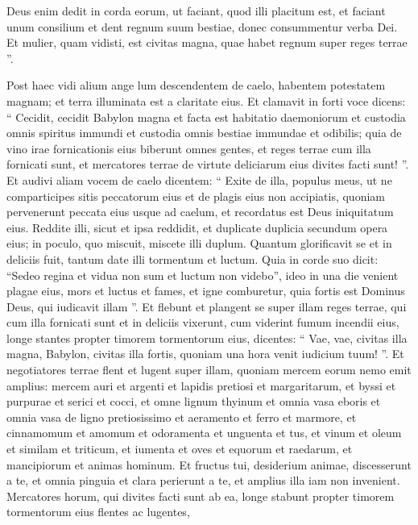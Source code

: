 \begin{biblechapter}
\begin{biblechapter}
\begin{biblechapter}
\begin{biblechapter}
\begin{biblechapter}
\begin{biblechapter}
\begin{biblechapter}
\begin{biblechapter}
\begin{biblechapter}
\begin{biblechapter}
\begin{biblechapter}
\begin{biblechapter}
\begin{biblechapter}
\begin{biblechapter}
\begin{biblechapter}
\begin{biblechapter}
\begin{biblechapter}
\verse Deus enim dedit in corda eorum, ut faciant, quod illi placitum est, et faciant unum consilium et dent regnum suum bestiae, donec consummentur verba Dei. 
\verse Et mulier, quam vidisti, est civitas magna, quae habet regnum super reges terrae ”.
 
\begin{biblechapter}
\verse Post haec vidi alium ange lum descendentem de caelo, habentem potestatem magnam; et terra illuminata est a claritate eius. 
\verse Et clamavit in forti voce dicens: “ Cecidit, cecidit Babylon magna et facta est habitatio daemoniorum et custodia omnis spiritus immundi et custodia omnis bestiae immundae et odibilis; 
\verse quia de vino irae fornicationis eius biberunt omnes gentes, et reges terrae cum illa fornicati sunt, et mercatores terrae de virtute deliciarum eius divites facti sunt! ”.
 \verse Et audivi aliam vocem de caelo dicentem: “ Exite de illa, populus meus, ut ne comparticipes sitis peccatorum eius et de plagis eius non accipiatis, 
\verse quoniam pervenerunt peccata eius usque ad caelum, et recordatus est Deus iniquitatum eius. 
\verse Reddite illi, sicut et ipsa reddidit, et duplicate duplicia secundum opera eius; in poculo, quo miscuit, miscete illi duplum. 
\verse Quantum glorificavit se et in deliciis fuit, tantum date illi tormentum et luctum. Quia in corde suo dicit: “Sedeo regina et vidua non sum et luctum non videbo”, 
\verse ideo in una die venient plagae eius, mors et luctus et fames, et igne comburetur, quia fortis est Dominus Deus, qui iudicavit illam ”.
 \verse Et flebunt et plangent se super illam reges terrae, qui cum illa fornicati sunt et in deliciis vixerunt, cum viderint fumum incendii eius, 
\verse longe stantes propter timorem tormentorum eius, dicentes: “ Vae, vae, civitas illa magna, Babylon, civitas illa fortis, quoniam una hora venit iudicium tuum! ”.
 \verse Et negotiatores terrae flent et lugent super illam, quoniam mercem eorum nemo emit amplius: 
\verse mercem auri et argenti et lapidis pretiosi et margaritarum, et byssi et purpurae et serici et cocci, et omne lignum thyinum et omnia vasa eboris et omnia vasa de ligno pretiosissimo et aeramento et ferro et marmore, 
 \verse et cinnamomum et amomum et odoramenta et unguenta et tus, et vinum et oleum et similam et triticum, et iumenta et oves et equorum et raedarum, et mancipiorum et animas hominum. 
\verse Et fructus tui, desiderium animae, discesserunt a te, et omnia pinguia et clara perierunt a te, et amplius illa iam non invenient.
 \verse Mercatores horum, qui divites facti sunt ab ea, longe stabunt propter timorem tormentorum eius flentes ac lugentes, 

\end{biblechapter}
\end{biblechapter}
\end{biblechapter}
\end{biblechapter}
\end{biblechapter}
\end{biblechapter}
\end{biblechapter}
\end{biblechapter}
\end{biblechapter}
\end{biblechapter}
\end{biblechapter}
\end{biblechapter}
\end{biblechapter}
\end{biblechapter}
\end{biblechapter}
\end{biblechapter}
\end{biblechapter}
\end{biblechapter}
